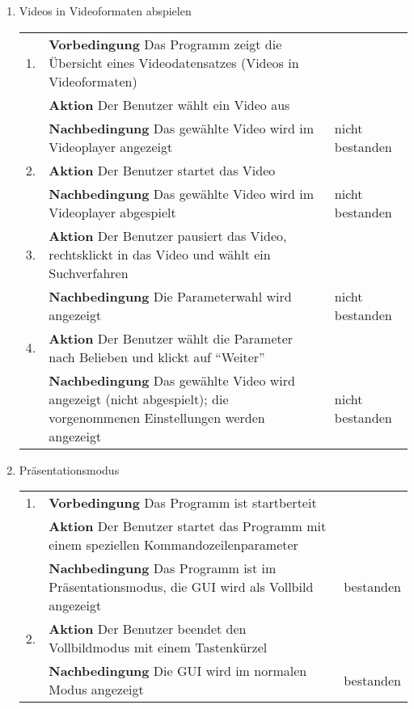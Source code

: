 \begin{enumerate} [label=\bfseries /TSW \arabic*0/, leftmargin=*]
	\item Videos in Videoformaten abspielen \label{ts:echtes_video_abspielen} \newline \newline
	\begin{tabular}{rp{4in}|l}
	1. & \textbf{Vorbedingung} Das Programm zeigt die Übersicht eines Videodatensatzes (Videos in Videoformaten) & \\
	   & \textbf{Aktion} Der Benutzer wählt ein Video aus & \\
	   & \textbf{Nachbedingung} Das gewählte Video wird im Videoplayer angezeigt & nicht bestanden \\
	\hline
	2. & \textbf{Aktion} Der Benutzer startet das Video & \\
	   & \textbf{Nachbedingung} Das gewählte Video wird im Videoplayer abgespielt & nicht bestanden \\
	\hline
	3. & \textbf{Aktion} Der Benutzer pausiert das Video, rechtsklickt in das Video und wählt ein Suchverfahren & \\
	   & \textbf{Nachbedingung} Die Parameterwahl wird angezeigt & nicht bestanden \\
	\hline
	4. & \textbf{Aktion} Der Benutzer wählt die Parameter nach Belieben und klickt auf \enquote{Weiter} & \\
	   & \textbf{Nachbedingung} Das gewählte Video wird angezeigt (nicht abgespielt); die vorgenommenen Einstellungen werden angezeigt & nicht bestanden \\
	\end{tabular}
	\pagebreak

	\item Präsentationsmodus \label{ts:präsentation} \newline \newline
	\begin{tabular}{rp{4in}|l}
	1. & \textbf{Vorbedingung} Das Programm ist startberteit & \\
	   & \textbf{Aktion} Der Benutzer startet das Programm mit einem speziellen Kommandozeilenparameter & \\
	   & \textbf{Nachbedingung} Das Programm ist im Präsentationsmodus, die GUI wird als Vollbild angezeigt & bestanden \\
	\hline
	2. & \textbf{Aktion} Der Benutzer beendet den Vollbildmodus mit einem Tastenkürzel & \\
	   & \textbf{Nachbedingung}	Die GUI wird im normalen Modus angezeigt & bestanden \\
	\end{tabular}
	\newline


\end{enumerate}
